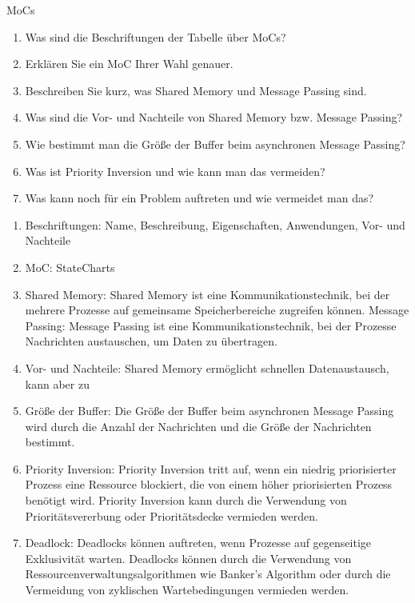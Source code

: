 \documentclass{article}
\begin{document}
\begin{exercise}{MoCs}
  \begin{enumerate}
    \item Was sind die Beschriftungen der Tabelle über MoCs?
    \item Erklären Sie ein MoC Ihrer Wahl genauer.
    \item Beschreiben Sie kurz, was Shared Memory und Message Passing sind.
    \item Was sind die Vor- und Nachteile von Shared Memory bzw. Message Passing?
    \item Wie bestimmt man die Größe der Buffer beim asynchronen Message Passing?
    \item Was ist Priority Inversion und wie kann man das vermeiden?
    \item Was kann noch für ein Problem auftreten und wie vermeidet man das?
  \end{enumerate}

  \begin{solution}
    \begin{enumerate}
      \item Beschriftungen: Name, Beschreibung, Eigenschaften, Anwendungen, Vor- und Nachteile
      \item MoC: StateCharts
      \item Shared Memory: Shared Memory ist eine Kommunikationstechnik, bei der mehrere Prozesse auf gemeinsame Speicherbereiche zugreifen können. Message Passing: Message Passing ist eine Kommunikationstechnik, bei der Prozesse Nachrichten austauschen, um Daten zu übertragen.
      \item Vor- und Nachteile: Shared Memory ermöglicht schnellen Datenaustausch, kann aber zu
      \item Größe der Buffer: Die Größe der Buffer beim asynchronen Message Passing wird durch die Anzahl der Nachrichten und die Größe der Nachrichten bestimmt.
      \item Priority Inversion: Priority Inversion tritt auf, wenn ein niedrig priorisierter Prozess eine Ressource blockiert, die von einem höher priorisierten Prozess benötigt wird. Priority Inversion kann durch die Verwendung von Prioritätsvererbung oder Prioritätsdecke vermieden werden.
      \item Deadlock: Deadlocks können auftreten, wenn Prozesse auf gegenseitige Exklusivität warten. Deadlocks können durch die Verwendung von Ressourcenverwaltungsalgorithmen wie Banker's Algorithm oder durch die Vermeidung von zyklischen Wartebedingungen vermieden werden.
    \end{enumerate}
  \end{solution}
\end{exercise}
\end{document}
